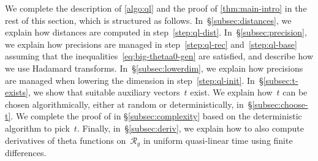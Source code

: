 \documentclass[12pt,oneside]{amsart}
\numberwithin{equation}{section}
\theoremstyle{definition}
\newcommand{\red}{\mathcal{R}}
\begin{document}
We complete the description of \cref{algo:ql} and the proof of
\cref{thm:main-intro} in the rest of this section, which is structured as
follows.  In~§\ref{subsec:distances}, we explain how distances are computed in
step~\eqref{step:ql-dist}. In~§\ref{subsec:precision}, we explain how
precisions are managed in step~\eqref{step:ql-rec} and~\eqref{step:ql-base}
assuming that the inequalities~\eqref{eq:big-thetaa0-gen} are satisfied, and
describe how we use Hadamard transforms. In~§\ref{subsec:lowerdim}, we explain
how precisions are managed when lowering the dimension in
step~\eqref{step:ql-init}. In~§\ref{subsec:t-exists}, we show that suitable
auxiliary vectors~$t$ exist. We explain how~$t$ can be chosen algorithmically,
either at random or deterministically, in~§\ref{subsec:choose-t}. We complete
the proof of  in §\ref{subsec:complexity} based on the
deterministic algorithm to pick~$t$. Finally, in~§\ref{subsec:deriv}, we
explain how to also compute derivatives of theta functions on~$\red_g$ in uniform
quasi-linear time using finite differences.
\end{document}
